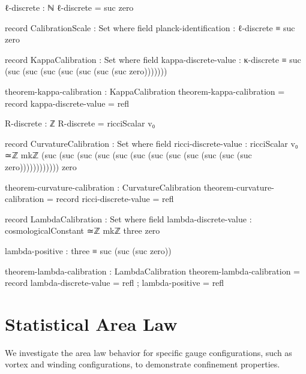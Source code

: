 \documentclass[11pt,a4paper]{book}
\begin{document}
\begin{code}
ℓ-discrete : ℕ
ℓ-discrete = suc zero

record CalibrationScale : Set where
  field
    planck-identification : ℓ-discrete ≡ suc zero
    
record KappaCalibration : Set where
  field
    kappa-discrete-value : κ-discrete ≡ suc (suc (suc (suc (suc (suc (suc (suc zero)))))))
    
theorem-kappa-calibration : KappaCalibration
theorem-kappa-calibration = record
  { kappa-discrete-value = refl
  }

R-discrete : ℤ
R-discrete = ricciScalar v₀

record CurvatureCalibration : Set where
  field
    ricci-discrete-value : ricciScalar v₀ ≃ℤ mkℤ (suc (suc (suc (suc (suc (suc (suc 
                            (suc (suc (suc (suc (suc zero)))))))))))) zero
    
theorem-curvature-calibration : CurvatureCalibration
theorem-curvature-calibration = record
  { ricci-discrete-value = refl
  }

record LambdaCalibration : Set where
  field
    lambda-discrete-value : cosmologicalConstant ≃ℤ mkℤ three zero
    
    lambda-positive : three ≡ suc (suc (suc zero))

theorem-lambda-calibration : LambdaCalibration
theorem-lambda-calibration = record
  { lambda-discrete-value = refl
  ; lambda-positive = refl
  }
\end{code}

\section{Statistical Area Law}

We investigate the area law behavior for specific gauge configurations, such as vortex and winding configurations, to demonstrate confinement properties.
\end{document}
